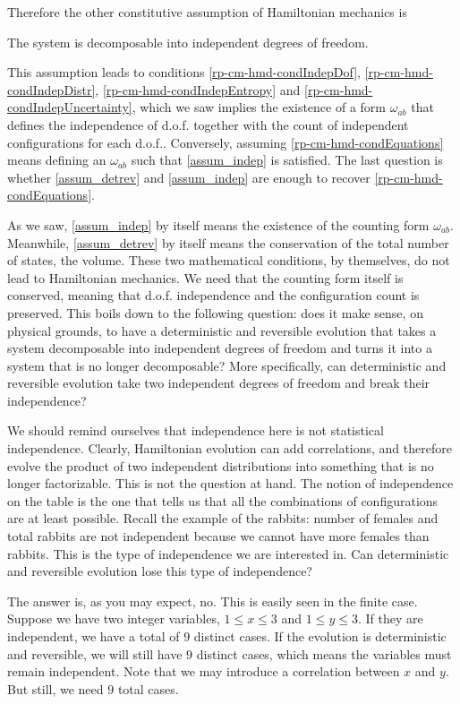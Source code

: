 Therefore the other constitutive assumption of Hamiltonian mechanics is
\renewcommand{\theassump}{IND}
\begin{assump}[Independent d.o.f.]\label{assum_indep}
	The system is decomposable into independent degrees of freedom.
\end{assump}
\renewcommand{\theassump}{\Roman{assump}}
This assumption leads to conditions \ref{rp-cm-hmd-condIndepDof}, \ref{rp-cm-hmd-condIndepDistr}, \ref{rp-cm-hmd-condIndepEntropy} and
\ref{rp-cm-hmd-condIndepUncertainty}, which we saw implies the existence of a form $\omega_{ab}$ that defines the independence of d.o.f. together with the count of independent configurations for each d.o.f.. Conversely, assuming \ref{rp-cm-hmd-condEquations} means defining an $\omega_{ab}$ such that \ref{assum_indep} is satisfied. The last question is whether \ref{assum_detrev} and \ref{assum_indep} are enough to recover \ref{rp-cm-hmd-condEquations}.

As we saw, \ref{assum_indep} by itself means the existence of the counting form $\omega_{ab}$. Meanwhile, \ref{assum_detrev} by itself means the conservation of the total number of states, the volume. These two mathematical conditions, by themselves, do not lead to Hamiltonian mechanics. We need that the counting form itself is conserved, meaning that d.o.f. independence and the configuration count is preserved. This boils down to the following question: does it make sense, on physical grounds, to have a deterministic and reversible evolution that takes a system decomposable into independent degrees of freedom and turns it into a system that is no longer decomposable? More specifically, can deterministic and reversible evolution take two independent degrees of freedom and break their independence?

We should remind ourselves that independence here is not statistical independence. Clearly, Hamiltonian evolution can add correlations, and therefore evolve the product of two independent distributions into something that is no longer factorizable. This is not the question at hand. The notion of independence on the table is the one that tells us that all the combinations of configurations are at least possible. Recall the example of the rabbits: number of females and total rabbits are not independent because we cannot have more females than rabbits. This is the type of independence we are interested in. Can deterministic and reversible evolution lose this type of independence?

The answer is, as you may expect, no. This is easily seen in the finite case. Suppose we have two integer variables, $1 \leq x \leq 3$ and $1 \leq y \leq 3$. If they are independent, we have a total of $9$ distinct cases. If the evolution is deterministic and reversible, we will still have $9$ distinct cases, which means the variables must remain independent. Note that we may introduce a correlation between $x$ and $y$. But still, we need $9$ total cases.

